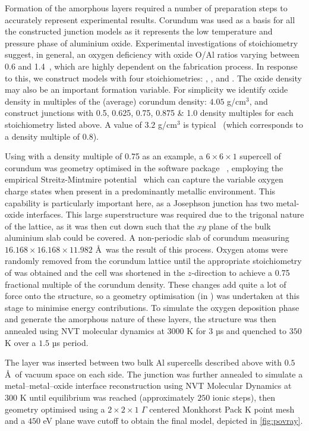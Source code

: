 Formation of the amorphous  layers required a number of preparation steps to accurately represent experimental results.
Corundum was used as a basis for all the constructed junction models as it represents the low temperature and pressure phase of aluminium oxide.
Experimental investigations of stoichiometry suggest, in general, an oxygen deficiency with oxide O/Al ratios varying between 0.6 and 1.4~\cite{Tan2005}, which are highly dependent on the fabrication process.
In response to this, we construct models with four stoichiometries: , ,  and .
The oxide density may also be an important formation variable.
For simplicity we identify oxide density in multiples of the (average) corundum density: $4.05$ g/cm$^\text{3}$, and construct junctions with 0.5, 0.625, 0.75, 0.875 \& 1.0 density multiples for each stoichiometry listed above.
A value of $3.2$ g/cm$^\text{3}$ is typical~\cite{Barbour1998} (which corresponds to a density multiple of 0.8).

Using  with a density multiple of 0.75 as an example, a $6\!\times\!6\!\times\!1$ supercell of corundum was geometry optimised in the software package ~\cite{Gale2003}, employing the empirical Streitz-Mintmire potential~\cite{Streitz1994} which can capture the variable oxygen charge states when present in a predominantly metallic environment. This capability is particularly important here, as a Josephson junction has two metal-oxide interfaces.
This large superstructure was required due to the trigonal nature of the lattice, as it was then cut down such that the $xy$ plane of the bulk aluminium slab could be covered.
A non-periodic slab of corundum measuring $16.168\!\times\!16.168\!\times\!11.982$ \AA\ was the result of this process.
Oxygen atoms were randomly removed from the corundum lattice until the appropriate stoichiometry of  was obtained and the cell was shortened in the $z$-direction to achieve a 0.75 fractional multiple of the corundum density.
These changes add quite a lot of force onto the structure, so a geometry optimisation (in ) was undertaken at this stage to minimise energy contributions.
To simulate the oxygen deposition phase and generate the amorphous nature of these layers, the structure was then annealed using NVT molecular dynamics at $3000$ K for $3$ µs and quenched to $350$ K over a $1.5$ µs period.

The  layer was inserted between two bulk Al supercells described above with $0.5$ \AA\ of vacuum space on each side.
The junction was further annealed to simulate a metal--metal--oxide interface reconstruction using  NVT Molecular Dynamics at $300$ K until equilibrium was reached (approximately $250$ ionic steps), then geometry optimised using a $2\!\times\!2\!\times\!1$ $\Gamma$ centered Monkhorst Pack K point mesh and a $450$ eV plane wave cutoff to obtain the final model, depicted in \cref{fig:povray}.

